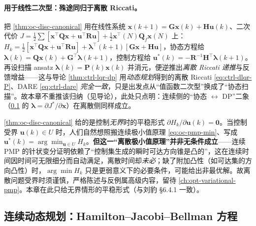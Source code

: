 \paragraph{用于线性二次型：殊途同归于离散 Riccati。}
把 \cref{thm:oc-disc-canonical} 用在线性系统 $\mathbf x(k+1)=\mathbf G\mathbf x(k)+\mathbf H\mathbf u(k)$、二次代价 $J=\tfrac12\sum[\mathbf x^\top\mathbf Q\mathbf x+\mathbf u^\top\mathbf R\mathbf u]+\tfrac12\mathbf x^\top(N)\mathbf Q_f\mathbf x(N)$ 上：$H_k=\tfrac12[\mathbf x^\top\mathbf Q\mathbf x+\mathbf u^\top\mathbf R\mathbf u]+\boldsymbol\lambda^\top(k+1)[\mathbf G\mathbf x+\mathbf H\mathbf u]$，协态方程给 $\boldsymbol\lambda(k)=\mathbf Q\mathbf x(k)+\mathbf G^\top\boldsymbol\lambda(k+1)$，控制方程给 $\mathbf u^*(k)=-\mathbf R^{-1}\mathbf H^\top\boldsymbol\lambda(k+1)$。再设扫描 ansatz $\boldsymbol\lambda(k)=\mathbf P(k)\mathbf x(k)$ 并消元，便逆推出\emph{离散 Riccati 递推}与反馈增益——这与导论 \cref{thm:ctrl-lqr-dp} 用\emph{动态规划}得到的离散 Riccati \cref{eq:ctrl-dlqr-P}、DARE \cref{eq:ctrl-dare} \emph{完全一致}，只是出发点从“值函数二次型”换成了“协态扫描”。故本章不重推该归纳（见导论），此处只点明：连续侧的“协态 $\leftrightarrow$ DP”二象（\cref{sec:oc-hjb} 的 $\boldsymbol\lambda=\partial J^*/\partial\mathbf x$）在离散侧同样成立。

\begin{pitfall}
\cref{thm:oc-disc-canonical} 给的是控制\emph{无界}时的平稳形式 $\partial H_k/\partial\mathbf u(k)=\mathbf0$。当控制受界 $\mathbf u(k)\in U$ 时，人们自然想照搬连续极小值原理 \cref{eq:oc-pmp-min}、写成 $\mathbf u^*(k)=\arg\min_{\mathbf u\in U}H_k$。\textbf{但这一“离散极小值原理”并非无条件成立}——连续 PMP 的针状变分证明依赖了“控制集生成的瞬时可达方向锥是凸的”，这在连续时间因时间可无限细分而自动满足，离散时间却\emph{未必}；缺了附加凸性（如可达集的方向凸性）时，$\arg\min H_k$ 只是更弱意义下的必要条件，可能给出非最优解。故离散问题受界时须谨慎，严格陈述与反例属高级内容，留待 \cref{ch:opt-variational-pmp}。本章在此只给无界情形的平稳形式（与刘豹 §6.4.1 一致）。
\end{pitfall}

\subsection{连续动态规划：Hamilton--Jacobi--Bellman 方程}
\label{sec:oc-hjb}

